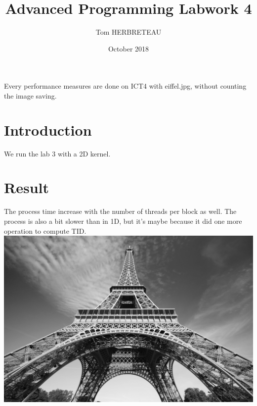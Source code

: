 \documentclass{article}
\title{Advanced Programming Labwork 4}
\author{Tom HERBRETEAU }
\date{October 2018}
\begin{document}
\maketitle
Every performance measures are done on ICT4 with eiffel.jpg, without counting the image saving.
\section{Introduction}
We run the lab 3 with a 2D kernel.
\section{Result}
\newline
The process time increase with the number of threads per block as well. The process is also a bit slower than in 1D, but it's maybe because it did one more operation to compute TID.
\newline
\includegraphics[width=\textwidth]{labwork4-gpu-out.jpg}

\end{document}

